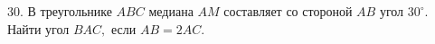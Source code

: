 30. В треугольнике $ABC$ медиана $AM$ составляет со стороной $AB$ угол $30^\circ.$ Найти угол $BAC,$ если $AB=2AC.$\\
